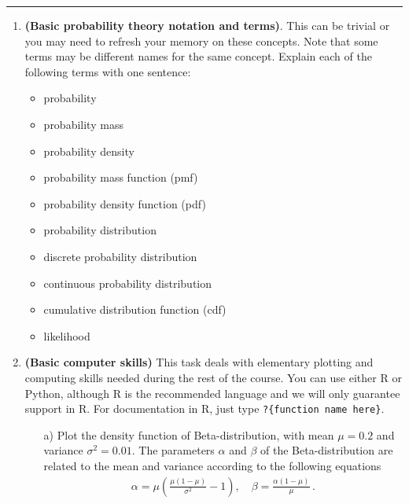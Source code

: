 \documentclass[11pt,a4paper,english]{article}
\newcommand{\HRule}{\rule{\linewidth}{0.5mm}}
\begin{document}
\HRule

\newpage

\begin{enumerate}

\item {\bf (Basic probability theory notation and terms)}. This can be trivial or you may need to refresh your memory on these concepts. Note that some terms may be different names for the same concept. Explain each of the following terms with one sentence:
  \begin{itemize}
    \item probability
    \item probability mass
    \item probability density
    \item probability mass function (pmf)
    \item probability density function (pdf)
    \item probability distribution
    \item discrete probability distribution
    \item continuous probability distribution
    \item cumulative distribution function (cdf)
    \item likelihood
  \end{itemize}

\item {\bf (Basic computer skills)} This task deals with elementary plotting and computing skills needed during the rest of the course. You can use either R or Python, although R is the recommended language and we will only guarantee support in R. For documentation in R, just type \texttt{?\{function name here\}}.
\begin{itemize}
    \item[a)] Plot the density function of Beta-distribution, with mean $\mu = 0.2$ and variance $\sigma^2=0.01$. The parameters $\alpha$ and $\beta$ of the Beta-distribution are related to the mean and variance according to the following equations
    \begin{align*}
    \alpha = \mu \left( \frac{\mu(1-\mu)}{\sigma^2} - 1 \right), \quad
    \beta = \frac{\alpha (1-\mu) }{\mu} \,.
\end{align*}


\end{itemize}
\end{enumerate}
\end{document}
